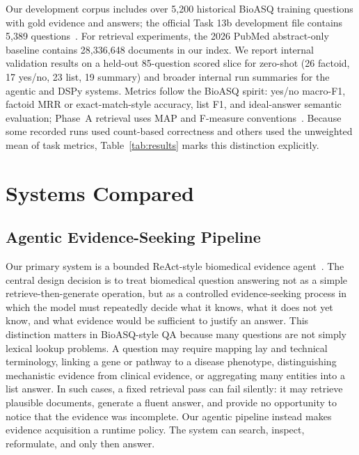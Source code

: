\documentclass[sigconf,nonacm]{acmart}
\begin{document}
Our development corpus includes over 5,200 historical BioASQ training questions with gold evidence and answers; the official Task 13b development file contains 5,389 questions~\cite{bioasq_task14b}. For retrieval experiments, the 2026 PubMed abstract-only baseline contains 28,336,648 documents in our index. We report internal validation results on a held-out 85-question scored slice for zero-shot (26 factoid, 17 yes/no, 23 list, 19 summary) and broader internal run summaries for the agentic and DSPy systems. Metrics follow the BioASQ spirit: yes/no macro-F1, factoid MRR or exact-match-style accuracy, list F1, and ideal-answer semantic evaluation; Phase~A retrieval uses MAP and F-measure conventions~\cite{bioasq_eval}. Because some recorded runs used count-based correctness and others used the unweighted mean of task metrics, Table~\ref{tab:results} marks this distinction explicitly.

\section{Systems Compared}

\subsection{Agentic Evidence-Seeking Pipeline}

Our primary system is a bounded ReAct-style biomedical evidence agent~\cite{yao2023react}. The central design decision is to treat biomedical question answering not as a simple retrieve-then-generate operation, but as a controlled evidence-seeking process in which the model must repeatedly decide what it knows, what it does not yet know, and what evidence would be sufficient to justify an answer. This distinction matters in BioASQ-style QA because many questions are not simply lexical lookup problems. A question may require mapping lay and technical terminology, linking a gene or pathway to a disease phenotype, distinguishing mechanistic evidence from clinical evidence, or aggregating many entities into a list answer. In such cases, a fixed retrieval pass can fail silently: it may retrieve plausible documents, generate a fluent answer, and provide no opportunity to notice that the evidence was incomplete. Our agentic pipeline instead makes evidence acquisition a runtime policy. The system can search, inspect, reformulate, and only then answer.
\end{document}
